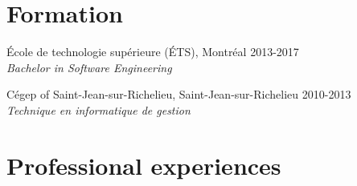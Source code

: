 \documentclass{res}
\newcommand{\inFrench}[1]{}
\newcommand{\inEnglish}[1]{#1}
\begin{document}
\begin{resume}
\section{Formation}
\vspace{4pt}

\inFrench{
	École de technologie supérieure (ÉTS), Montréal
	\hfill 2013-2017 \\
	{\sl Baccalauréat en génie logiciel}

	Cégep de Saint-Jean-sur-Richelieu, Saint-Jean-sur-Richelieu
	\hfill 2010-2013 \\
	{\sl Technique en informatique de gestion}
}
\inEnglish{
	École de technologie supérieure (ÉTS), Montréal
	\hfill 2013-2017 \\
	{\sl Bachelor in Software Engineering}

	Cégep of Saint-Jean-sur-Richelieu, Saint-Jean-sur-Richelieu
	\hfill 2010-2013 \\
	{\sl Technique en informatique de gestion}
}


\inFrench{
	\section{Expériences professionnelles}
}
\inEnglish{
	\section{Professional experiences}
}
\vspace{6pt}

\inFrench{
	Ericsson, Montréal\footnotemark
	\hfill mai à septembre 2016 \\
	{\sl Développeur Java} \hfill (Stage universitaire 3)
	\vspace{0.05in}

	\begin{itemize} \itemsep -2pt
		\item Ajout de fonctionnalités dans une API d'IPTV (Java);
		\item Création et amélioration d'utilitaires pour tests (Bash, JavaScript et Python);
		\item Développement d'une application de contrôle d'accès à base de rôles (RBAC) en Python;
		\item Fonctionnalités d'exportation et d'importation de données d'un serveur LDAP à des serveurs Linux.
	\end{itemize}

}
\end{resume}
\end{document}
